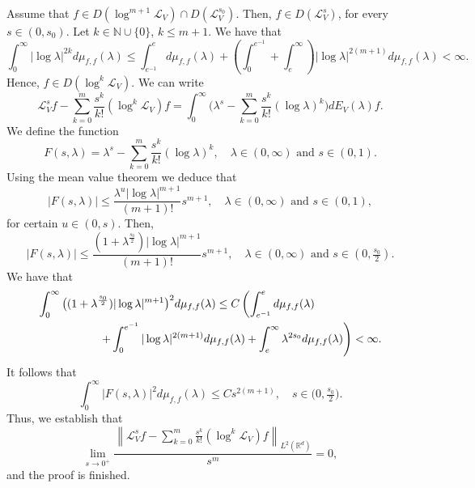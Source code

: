 \documentclass[10pt, a4paper, reqno]{amsart}
\theoremstyle{definition}
\theoremstyle{remark}
\numberwithin{equation}{section}
\begin{document}
Assume that $f\in D(\log ^{m+1}\mathcal L_V)\cap D(\mathcal L_V^{s_0})$. Then, $f\in D(\mathcal L_V^s)$, for every $s\in (0,s_0)$. Let $k\in \mathbb N\cup\{0\}$, $k\leq m+1$. We have that
\[
\int_0^\infty |\log \lambda |^{2k}d\mu_{f,f}(\lambda )\leq \int_{e^{-1}}^ed\mu _{f,f}(\lambda) +\left(\int_0^{e^{-1}}+\int_e^\infty \right)|\log \lambda |^{2(m+1)}d\mu_{f,f}(\lambda )<\infty.
\]
Hence, $f\in D(\log ^k\mathcal L_V)$. We can write
\[
\mathcal L_V^sf-\sum_{k=0}^m\frac{s^k}{k!}(\log^k\mathcal L_V)f=\int_0^\infty \Big(\lambda ^s-\sum_{k=0}^m\frac{s^k}{k!}(\log \lambda )^k\Big)dE_V(\lambda)f.
\]
We define the function
\[
F(s,\lambda )=\lambda ^s-\sum_{k=0}^m\frac{s^k}{k!}(\log \lambda )^k,\quad \lambda \in (0,\infty )\mbox{ and }s\in (0,1).
\]
Using the mean value theorem we deduce that
\[
|F(s,\lambda )|\leq \frac{\lambda ^u|\log \lambda |^{m+1}}{(m+1)!}s^{m+1},\quad \lambda \in (0,\infty )\mbox{ and }s\in (0,1),
\]
for certain $u\in (0,s)$. Then,
\[
|F(s,\lambda )|\leq \frac{(1+\lambda ^{\frac{s_0}{2}})|\log \lambda |^{m+1}}{(m+1)!}s^{m+1},\quad \lambda \in (0,\infty )\mbox{ and }s\in \left(0,\tfrac{s_0}{2}\right).
\]
We have that
\begin{align*}
\int_0^\infty \big((1+\lambda ^{\frac{s_0}{2}})|\log \lambda |^{m+1}\big)^2d\mu_{f,f}(\lambda )&\leq C\left(\int_{e^{-1}}^ed\mu _{f,f}(\lambda) \right.\\
&\hspace{-4cm}\quad \left.+\int_0^{e^{-1}}|\log \lambda |^{2(m+1)}d\mu _{f,f}(\lambda)+\int_e^\infty\lambda ^{2s_0}d\mu_{f,f}(\lambda )\right)<\infty.
\end{align*}
It follows that
\[
\int_0^\infty |F(s,\lambda )|^2d\mu_{f,f}(\lambda )\leq Cs^{2(m+1)},\quad s\in \big (0,\tfrac{s_0}{2}\big).
\]
Thus, we establish that
\[
\lim_{s\rightarrow 0^+}\frac{\left\|\mathcal L_V^s f-\sum_{k=0}^m\frac{s^k}{k!}(\log ^k\mathcal L_V)f\right\|_{L^2(\mathbb R^d)}}{s^m}=0,
\]
and the proof is finished.
\end{document}
